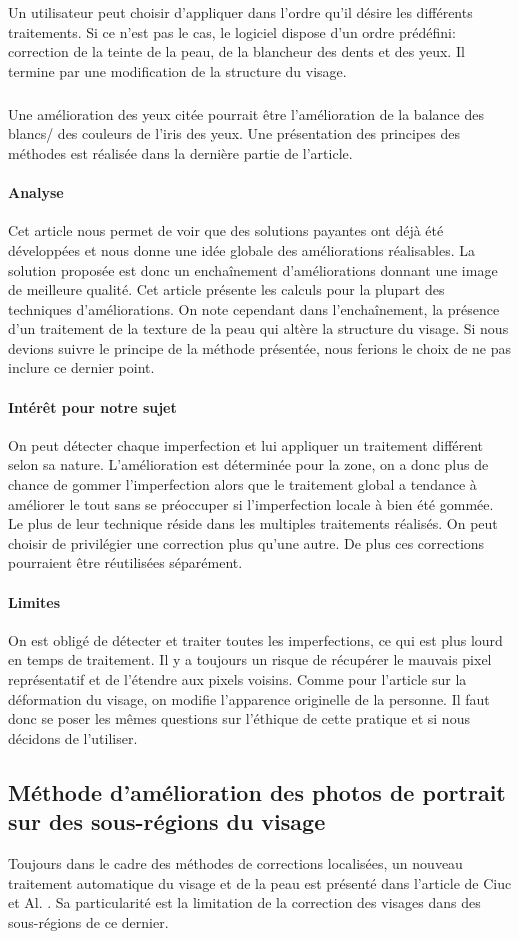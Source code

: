\documentclass[11pt, french,screen]{report-rd-info}
\begin{document}
Un utilisateur peut choisir d’appliquer dans l’ordre qu’il désire les différents traitements. Si ce n’est pas le cas, le logiciel dispose d’un ordre prédéfini: correction de la teinte de la peau, de la blancheur des dents et des yeux. Il termine par une modification de la structure du visage.
\subparagraph{}
Une amélioration des yeux citée pourrait être l’amélioration de la balance des blancs/ des couleurs de l’iris des yeux. Une présentation des principes des méthodes est réalisée dans la dernière partie de l’article.
\paragraph{Analyse}
Cet article nous permet de voir que des solutions payantes ont déjà été développées et nous donne une idée globale des améliorations réalisables. La solution proposée est donc un enchaînement d’améliorations donnant une image de meilleure qualité. Cet article présente les calculs pour la plupart des techniques d’améliorations. On note cependant dans l'enchaînement, la présence d’un traitement de la texture de la peau qui altère la structure du visage. Si nous devions suivre le principe de la méthode présentée, nous ferions le choix de ne pas inclure ce dernier point.
\paragraph{Intérêt pour notre sujet}
On peut détecter chaque imperfection et lui appliquer un traitement différent selon sa nature. L’amélioration est déterminée pour la zone, on a donc plus de chance de gommer l’imperfection alors que le traitement global a tendance à améliorer le tout sans se préoccuper si l’imperfection locale à bien été gommée. Le plus de leur technique réside dans les multiples traitements réalisés. On peut choisir de privilégier une correction plus qu’une autre. De plus ces corrections pourraient être réutilisées séparément.
\paragraph{Limites}
On est obligé de détecter et traiter toutes les imperfections, ce qui est plus lourd en temps de traitement.
Il y a toujours un risque de récupérer le mauvais pixel représentatif et de l’étendre aux pixels voisins.
Comme pour l’article sur la déformation du visage, on modifie l’apparence originelle de la personne. Il faut donc se poser les mêmes questions sur l’éthique de cette pratique et si nous décidons de l’utiliser.
\subsection{Méthode d’amélioration des photos de portrait sur des sous-régions du visage}
Toujours dans le cadre des méthodes de corrections localisées, un nouveau traitement automatique du visage et de la peau est présenté dans l’article de Ciuc et Al. \cite{Ciuc2010}. Sa particularité est la limitation de la correction des visages dans des sous-régions de ce dernier.
\end{document}
